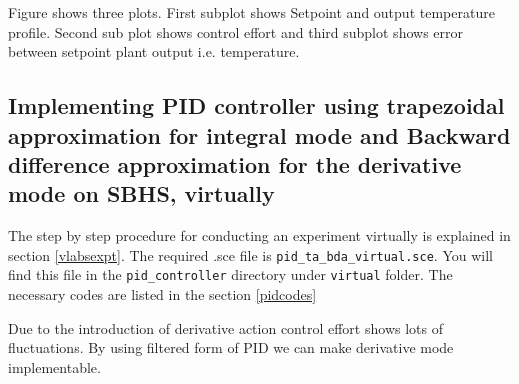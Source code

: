  Figure shows three plots. First subplot shows Setpoint and output temperature profile. Second sub plot shows control effort and third subplot shows error between setpoint plant output i.e. temperature.

\subsection{Implementing PID controller using trapezoidal approximation for integral mode and Backward difference approximation for the derivative mode on SBHS, virtually}
The step by step procedure for conducting an experiment virtually is explained in section \ref{vlabsexpt}. The required .sce file is {\tt pid\_ta\_bda\_virtual.sce}.  You will find this file in the {\tt pid\_controller} directory under {\tt virtual} folder.  The necessary codes are listed in the section \ref{pidcodes}

Due to the introduction of derivative action control effort shows lots of fluctuations. By using filtered form of PID we can make derivative mode implementable.


